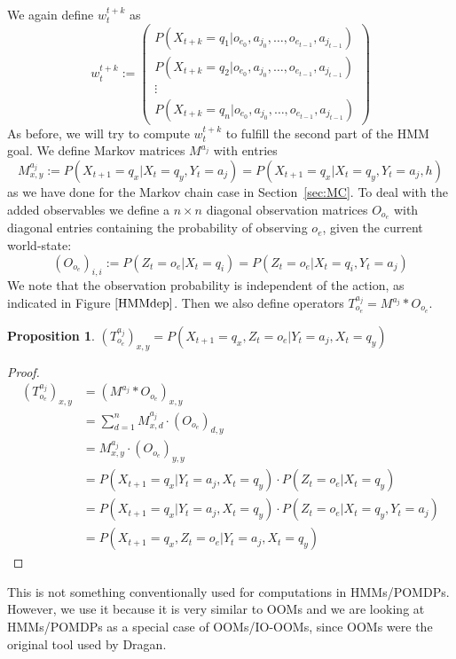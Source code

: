 \documentclass{article}
\newtheorem{prop}{Proposition}
\theoremstyle{definition}
\def\mc{Markov chain}
\begin{document}
We again define $w_t^{t+k}$ as 
\[
w_t^{t+k}:=
\left ( 
\begin{matrix}
P(X_{t+k}=q_1|o_{e_0},a_{j_0},\ldots,o_{e_{t-1}},a_{j_{t-1}}) \\
P(X_{t+k}=q_2|o_{e_0},a_{j_0},\ldots,o_{e_{t-1}},a_{j_{t-1}}) \\
\vdots \\
P(X_{t+k}=q_n|o_{e_0},a_{j_0},\ldots,o_{e_{t-1}},a_{j_{t-1}}) 
\end{matrix}
\right )
\]
As before, we will try to compute $w_t^{t+k}$ to fulfill the second part of the HMM goal. 
We define Markov matrices $M^{a_j}$ with entries 
\[
M^{a_j}_{x,y}:=P(X_{t+1}=q_x|X_{t}=q_y,Y_t=a_j)=P(X_{t+1}=q_x|X_t=q_y,Y_t=a_j,h)
\]
as we have done for the {\mc} case in Section~\ref{sec:MC}.  To deal with the added
observables we define a $n\times n$ diagonal observation matrices $O_{o_e}$ with diagonal
entries containing the probability of observing $o_e$, given the current world-state:
\[
(O_{o_e})_{i,i}:=P(Z_t=o_e|X_t=q_i)=P(Z_t=o_e|X_t=q_i,Y_t=a_j)
\]
We note that the observation probability is independent of the action, as indicated in Figure $\ref{HMMdep}$. 
Then we also define operators $T^{a_j}_{o_e}=M^{a_j}*O_{o_e}$. 
\begin{prop}
$(T^{a_j}_{o_e})_{x,y}=P(X_{t+1}=q_x,Z_t=o_e|Y_t=a_j,X_t=q_y)$ 
\end{prop}
\begin{proof}
\begin{align*}
(T^{a_j}_{o_e})_{x,y}&=(M^{a_j}*O_{o_e})_{x,y} \\
&=\sum\limits_{d=1}^{n} M^{a_j}_{x,d}\cdot (O_{o_e})_{d,y} \\
&=M^{a_j}_{x,y}\cdot (O_{o_e})_{y,y} \\
&=P(X_{t+1}=q_x|Y_t=a_j,X_t=q_y)\cdot P(Z_t=o_e|X_t=q_y) \\
&=P(X_{t+1}=q_x|Y_t=a_j,X_t=q_y)\cdot P(Z_t=o_e|X_t=q_y,Y_t=a_j) \\
&=P(X_{t+1}=q_x,Z_t=o_e|Y_t=a_j,X_t=q_y)
\end{align*}
\end{proof}
This is not something conventionally used for computations in HMMs/POMDPs. However, we use it because it is very similar to OOMs and we are looking at HMMs/POMDPs as a special case of OOMs/IO-OOMs, since OOMs were the original tool used by Dragan. 
\end{document}
